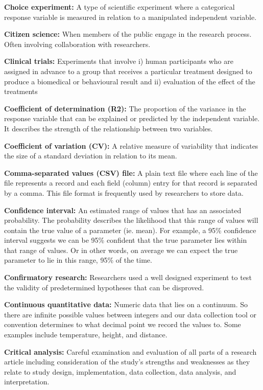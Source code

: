 \documentclass[
]{book}
\begin{document}
\textbf{Choice experiment:} A type of scientific experiment where a categorical response variable is measured in relation to a manipulated independent variable.

\textbf{Citizen science:} When members of the public engage in the research process. Often involving collaboration with researchers.

\textbf{Clinical trials:} Experiments that involve i) human participants who are assigned in advance to a group that receives a particular treatment designed to produce a biomedical or behavioural result and ii) evaluation of the effect of the treatments

\textbf{Coefficient of determination (R2):} The proportion of the variance in the response variable that can be explained or predicted by the independent variable. It describes the strength of the relationship between two variables.

\textbf{Coefficient of variation (CV):} A relative measure of variability that indicates the size of a standard deviation in relation to its mean.

\textbf{Comma-separated values (CSV) file:} A plain text file where each line of the file represents a record and each field (column) entry for that record is separated by a comma. This file format is frequently used by researchers to store data.

\textbf{Confidence interval:} An estimated range of values that has an associated probability. The probability describes the likelihood that this range of values will contain the true value of a parameter (ie. mean). For example, a 95\% confidence interval suggests we can be 95\% confident that the true parameter lies within that range of values. Or in other words, on average we can expect the true parameter to lie in this range, 95\% of the time.

\textbf{Confirmatory research:} Researchers used a well designed experiment to test the validity of predetermined hypotheses that can be disproved.

\textbf{Continuous quantitative data:} Numeric data that lies on a continuum. So there are infinite possible values between integers and our data collection tool or convention determines to what decimal point we record the values to. Some examples include temperature, height, and distance.

\textbf{Critical analysis:} Careful examination and evaluation of all parts of a research article including consideration of the study's strengths and weaknesses as they relate to study design, implementation, data collection, data analysis, and interpretation.
\end{document}
